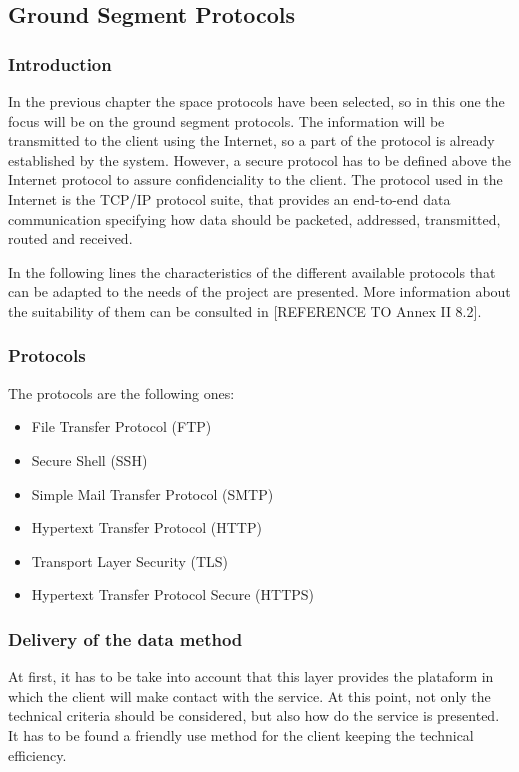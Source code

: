 \subsection{Ground Segment Protocols}

\subsubsection{Introduction}
In the previous chapter the space protocols have been selected, so in this one the focus will be on the ground segment protocols. The information will be transmitted to the client using the Internet, so a part of the protocol is already established by the system. However, a secure protocol has to be defined above the Internet protocol to assure confidenciality to the client. The protocol used in the Internet is the TCP/IP protocol suite, that provides an end-to-end data communication specifying how data should be packeted, addressed, transmitted, routed and received.

In the following lines the characteristics of the different available protocols that can be adapted to the needs of the project are presented. More information about the suitability of them can be consulted in [REFERENCE TO Annex II 8.2].

\subsubsection{Protocols}
The protocols are the following ones:
\begin{itemize}
\item File Transfer Protocol (FTP)
\item Secure Shell (SSH)
\item Simple Mail Transfer Protocol (SMTP)
\item Hypertext Transfer Protocol (HTTP)
\item Transport Layer Security (TLS)
\item Hypertext Transfer Protocol Secure (HTTPS)
\end{itemize} 

\subsubsection{Delivery of the data method} 
At first, it has to be take into account that this layer provides the plataform in which the client will make contact with the service. At this point, not only the technical criteria should be considered, but also how do the service is presented. It has to be found a friendly use method for the client keeping the technical efficiency.

